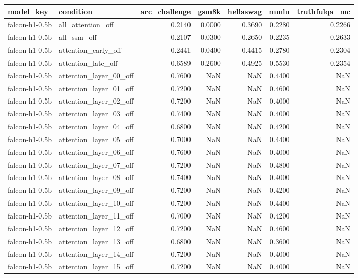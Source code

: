 \begin{tabular}{llrrrrr}
\toprule
model_key & condition & arc_challenge & gsm8k & hellaswag & mmlu & truthfulqa_mc \\
\midrule
falcon-h1-0.5b & all_attention_off & 0.2140 & 0.0000 & 0.3690 & 0.2280 & 0.2266 \\
falcon-h1-0.5b & all_ssm_off & 0.2107 & 0.0300 & 0.2650 & 0.2235 & 0.2633 \\
falcon-h1-0.5b & attention_early_off & 0.2441 & 0.0400 & 0.4415 & 0.2780 & 0.2304 \\
falcon-h1-0.5b & attention_late_off & 0.6589 & 0.2600 & 0.4925 & 0.5530 & 0.2354 \\
falcon-h1-0.5b & attention_layer_00_off & 0.7600 & NaN & NaN & 0.4400 & NaN \\
falcon-h1-0.5b & attention_layer_01_off & 0.7200 & NaN & NaN & 0.4600 & NaN \\
falcon-h1-0.5b & attention_layer_02_off & 0.7200 & NaN & NaN & 0.4000 & NaN \\
falcon-h1-0.5b & attention_layer_03_off & 0.7400 & NaN & NaN & 0.4000 & NaN \\
falcon-h1-0.5b & attention_layer_04_off & 0.6800 & NaN & NaN & 0.4200 & NaN \\
falcon-h1-0.5b & attention_layer_05_off & 0.7000 & NaN & NaN & 0.4400 & NaN \\
falcon-h1-0.5b & attention_layer_06_off & 0.7600 & NaN & NaN & 0.4000 & NaN \\
falcon-h1-0.5b & attention_layer_07_off & 0.7200 & NaN & NaN & 0.4800 & NaN \\
falcon-h1-0.5b & attention_layer_08_off & 0.7400 & NaN & NaN & 0.4000 & NaN \\
falcon-h1-0.5b & attention_layer_09_off & 0.7200 & NaN & NaN & 0.4200 & NaN \\
falcon-h1-0.5b & attention_layer_10_off & 0.7200 & NaN & NaN & 0.4400 & NaN \\
falcon-h1-0.5b & attention_layer_11_off & 0.7000 & NaN & NaN & 0.4200 & NaN \\
falcon-h1-0.5b & attention_layer_12_off & 0.7200 & NaN & NaN & 0.4600 & NaN \\
falcon-h1-0.5b & attention_layer_13_off & 0.6800 & NaN & NaN & 0.3600 & NaN \\
falcon-h1-0.5b & attention_layer_14_off & 0.7200 & NaN & NaN & 0.4000 & NaN \\
falcon-h1-0.5b & attention_layer_15_off & 0.7200 & NaN & NaN & 0.4000 & NaN \\

\end{tabular}
